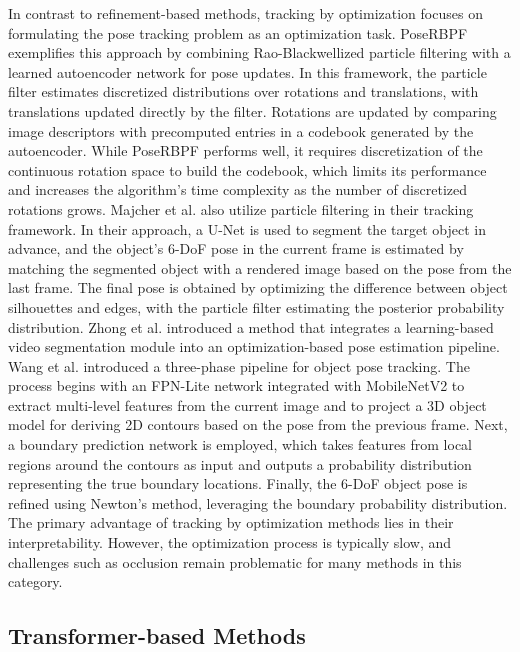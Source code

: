 In contrast to refinement-based methods, tracking by optimization focuses on formulating the pose tracking problem as an optimization task. PoseRBPF \cite{deng2021poserbpf} exemplifies this approach by combining Rao-Blackwellized particle filtering with a learned autoencoder network for pose updates. In this framework, the particle filter estimates discretized distributions over rotations and translations, with translations updated directly by the filter. Rotations are updated by comparing image descriptors with precomputed entries in a codebook generated by the autoencoder. While PoseRBPF performs well, it requires discretization of the continuous rotation space to build the codebook, which limits its performance and increases the algorithm's time complexity as the number of discretized rotations grows. Majcher et al. \cite{majcher20203d} also utilize particle filtering in their tracking framework. In their approach, a U-Net is used to segment the target object in advance, and the object's 6-DoF pose in the current frame is estimated by matching the segmented object with a rendered image based on the pose from the last frame. The final pose is obtained by optimizing the difference between object silhouettes and edges, with the particle filter estimating the posterior probability distribution. Zhong et al. \cite{zhong2020seeing} introduced a method that integrates a learning-based video segmentation module into an optimization-based pose estimation pipeline. Wang et al. \cite{wang2023deep} introduced a three-phase pipeline for object pose tracking. The process begins with an FPN-Lite network integrated with MobileNetV2 to extract multi-level features from the current image and to project a 3D object model for deriving 2D contours based on the pose from the previous frame. Next, a boundary prediction network is employed, which takes features from local regions around the contours as input and outputs a probability distribution representing the true boundary locations. Finally, the 6-DoF object pose is refined using Newton's method, leveraging the boundary probability distribution. The primary advantage of tracking by optimization methods lies in their interpretability. However, the optimization process is typically slow, and challenges such as occlusion remain problematic for many methods in this category.

\subsection{Transformer-based Methods}

